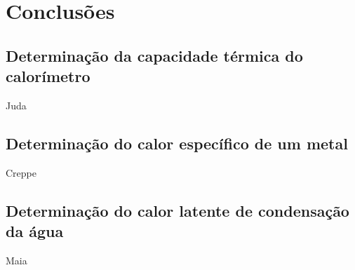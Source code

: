 \newpage
\section{Conclusões}


\subsection{Determinação da capacidade térmica do calorímetro}

Juda


\subsection{Determinação do calor específico de um metal}

Creppe


\subsection{Determinação do calor latente de condensação da água}

Maia

